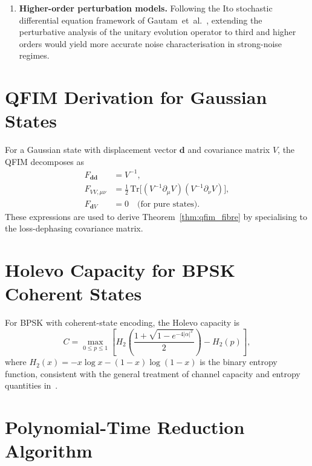 \documentclass[journal,twocolumn]{IEEEtran}
\theoremstyle{definition}
\theoremstyle{plain}
\newcommand{\Tr}{\mathrm{Tr}}
\begin{document}
\begin{enumerate}[leftmargin=*, label=(\arabic*), itemsep=2pt]
  \item \textbf{Higher-order perturbation models.}  Following
    the Ito stochastic differential equation framework of
    Gautam~et~al.~\cite{gautam2015a}, extending the perturbative
    analysis of the unitary evolution operator to third and higher
    orders would yield more accurate noise characterisation in
    strong-noise regimes.
\end{enumerate}

\appendices

\section{QFIM Derivation for Gaussian States}
\label{app:qfim}

For a Gaussian state with displacement vector $\mathbf{d}$ and
covariance matrix $V$, the QFIM decomposes as
\begin{align}
  F_{\mathbf{d}\mathbf{d}} &= V^{-1}, \label{eq:Fdd}\\
  F_{VV,\mu\nu} &= \tfrac{1}{2}\,\Tr\!\bigl[(V^{-1}\partial_\mu V)
    (V^{-1}\partial_\nu V)\bigr], \label{eq:FVV}\\
  F_{\mathbf{d}V} &= 0 \quad \text{(for pure states)}. \label{eq:FdV}
\end{align}
These expressions are used to derive Theorem~\ref{thm:qfim_fibre} by
specialising to the loss-dephasing covariance matrix.

\section{Holevo Capacity for BPSK Coherent States}
\label{app:holevo_bpsk}

For BPSK with coherent-state encoding, the Holevo capacity is
\begin{equation}
  C = \max_{0 \le p \le 1}\!\left[
    H_2\!\left(\frac{1+\sqrt{1-e^{-4|\alpha|^2}}}{2}\right)
    - H_2(p)\right],
  \label{eq:C_BPSK_appendix}
\end{equation}
where $H_2(x) = -x\log x - (1-x)\log(1-x)$ is the binary entropy
function, consistent with the general treatment of channel capacity
and entropy quantities in~\cite{cover2006}.

\section{Polynomial-Time Reduction Algorithm}
\label{app:reduction}
\end{document}
